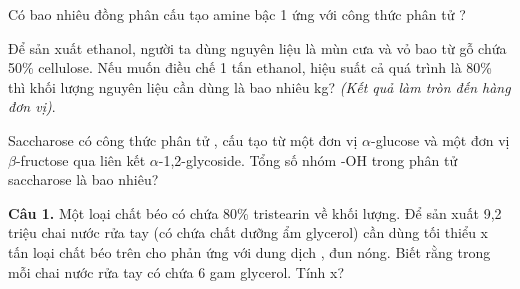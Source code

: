 \documentclass[11pt,a4paper]{article}
\begin{document}
\begin{ex}
Có bao nhiêu đồng phân cấu tạo amine bậc 1 ứng với công thức phân tử ?
\end{ex}

\begin{ex}
Để sản xuất ethanol, người ta dùng nguyên liệu là mùn cưa và vỏ bao từ gỗ chứa 50\% cellulose. Nếu muốn điều chế 1 tấn ethanol, hiệu suất cả quá trình là 80\% thì khối lượng nguyên liệu cần dùng là bao nhiêu kg? \textit{(Kết quả làm tròn đến hàng đơn vị)}.
\end{ex}

\begin{ex}
Saccharose có công thức phân tử , cấu tạo từ một đơn vị $\alpha$-glucose và một đơn vị $\beta$-fructose qua liên kết $\alpha$-1,2-glycoside. Tổng số nhóm -OH trong phân tử saccharose là bao nhiêu?
\end{ex}

\vspace{6pt}
\vspace{4pt}

\noindent\textbf{Câu 1.} Một loại chất béo có chứa 80\% tristearin về khối lượng. Để sản xuất 9,2 triệu chai nước rửa tay (có chứa chất dưỡng ẩm glycerol) cần dùng tối thiểu x tấn loại chất béo trên cho phản ứng với dung dịch , đun nóng. Biết rằng trong mỗi chai nước rửa tay có chứa 6 gam glycerol. Tính x?
\end{document}
